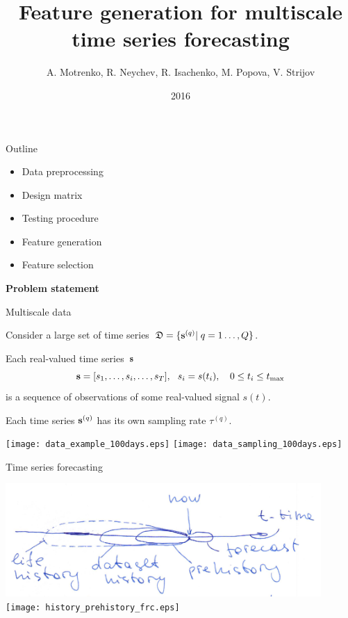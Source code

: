 \documentclass{beamer}
\title[\hbox to 56mm{Multiscale forecasting\hfill\insertframenumber\,/\,\inserttotalframenumber}]{Feature generation for multiscale time series forecasting}
\author[V. Strijov]{A. Motrenko, R. Neychev, R. Isachenko, M. Popova, V. Strijov}
\institute{Moscow Institute of Physics and Technology}
\date{2016}
\begin{document}
\begin{frame}
\maketitle
\end{frame}
\begin{frame}{Outline}


\begin{itemize}
\item Data preprocessing
\item Design matrix
\item Testing procedure
\item Feature generation
\item Feature selection
\end{itemize}

\end{frame}
\begin{frame}
\vfill
\begin{center}
{\Large \bf Problem statement}
\end{center}
\vfill
\end{frame}
\begin{frame}{Multiscale data}

Consider a large set of time series~${\mathfrak{D}}=\{{\mathbf{s}}^{(q)}| \; q = 1\dots, {Q}\}$.

\smallskip
Each real-valued time series~${\mathbf{s}}$ \[ {\mathbf{s}} = [s_1, \dots, s_i, \dots, s_{T}], ~~ s_i = s(t_i),\quad 0 \leq t_i \leq t_{\max}\]
is a sequence of observations  of some real-valued signal $s(t)$.


\smallskip
Each time series ${\mathbf{s}}^{(q)}$ has its own sampling rate $\tau^{(q)}$.

\texttt{[image: data\_example\_100days.eps]}
\texttt{[image: data\_sampling\_100days.eps]}

\end{frame}
\begin{frame}{Time series forecasting}

\includegraphics[width=0.9\textwidth]{online_forecasting_paradigm.png} \\


\texttt{[image: history\_prehistory\_frc.eps]}


\end{frame}
\end{document}
